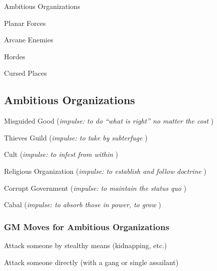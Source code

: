 \startitemize[1,packed]

\item Ambitious Organizations

 
\item Planar Forces

 
\item Arcane Enemies

 
\item Hordes

 
\item Cursed Places


\stopitemize
 
\subsection{Ambitious Organizations}    
 
\startitemize[1,packed]

\item Misguided Good ({\em impulse: to do “what is right” no matter the cost} )

 
\item Thieves Guild ({\em impulse: to take by subterfuge} )

 
\item Cult ({\em impulse: to infest from within} )

 
\item Religious Organization ({\em impulse: to establish and follow doctrine} )

 
\item Corrupt Government ({\em impulse: to maintain the status quo} )

 
\item Cabal ({\em impulse: to absorb those in power, to grow} )


\stopitemize
 
\subsubsection{GM Moves for Ambitious Organizations}      
 
\startitemize[1,packed]

\item Attack someone by stealthy means (kidnapping, etc.)

 
\item Attack someone directly (with a gang or single assailant)

